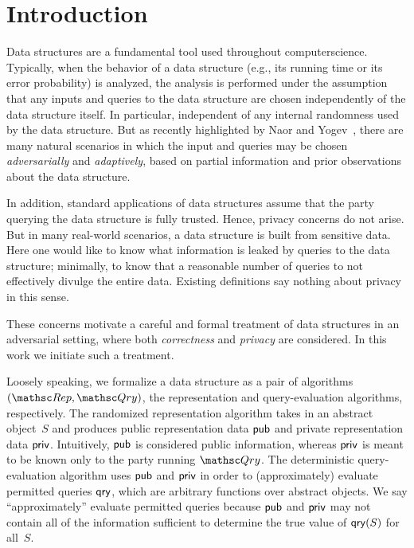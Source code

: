 \section{Introduction}
\label{sec:intro}

Data structures are a fundamental tool used throughout computerscience. Typically, when the behavior of a data structure (e.g., its running time or its error probability) is analyzed, the analysis is performed under the assumption that any inputs and queries to the data structure are chosen independently of the data structure itself.
In particular, independent of any internal randomness used by the data structure. But as recently highlighted by Naor and Yogev~\cite{naor2015bloom}, there are many natural scenarios in which the input and queries may be chosen \emph{adversarially} and \emph{adaptively}, based on partial information and prior observations about the data structure.

In addition, standard applications of data structures assume that the party querying the data structure is fully trusted. Hence, privacy concerns do not arise. But in many real-world scenarios, a data structure is built from sensitive data.  Here one would like to know what information is leaked by queries to the data structure; minimally, to know that a reasonable number of queries to not effectively divulge the entire data.  Existing definitions say nothing about privacy in this sense. 

These concerns motivate a careful and formal treatment of data structures in an adversarial setting, 
where both \emph{correctness} and \emph{privacy} are considered. In this work we initiate such a
treatment.  

 Loosely speaking, we formalize a data structure as a pair of algorithms $(\Rep,\Qry)$, the representation and query-evaluation algorithms, respectively.  The randomized representation algorithm takes in an abstract object~$S$ and produces public representation data ${\sf pub}$ and private representation data ${\sf priv}$.  Intuitively, ${\sf pub}$ is considered public information, whereas ${\sf priv}$ is meant to be known only to the party running $\Qry$.  The deterministic query-evaluation algorithm uses ${\sf pub}$ and ${\sf priv}$ in order to (approximately) evaluate permitted queries $\mathsf{qry}$, which are arbitrary functions over abstract objects.  We say ``approximately''  evaluate permitted queries because ${\sf pub}$ and ${\sf priv}$ may not contain all of the information sufficient to determine the true value of $\mathsf{qry}(S)$ for all~$S$.  

